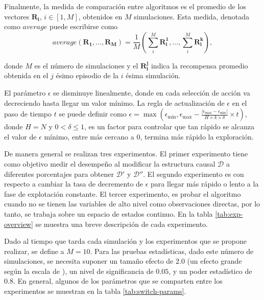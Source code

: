 Finalmente, la medida de comparación entre algoritmos es
el promedio de los vectores $\mathbf{R_i}$, $i\in [1, M]$,  obtenidos en $M$ simulaciones. Esta medida, denotada como  $average$ puede escribirse como 
\begin{equation}
\label{eq:average}
average(\mathbf{R_1}, \dots, \mathbf{R_M}) = \frac{1}{M}(\sum^M_i \mathbf{R_{i}^1}, \dots, \sum^M_i\mathbf{R_{i}^k}),    
\end{equation}

donde $M$ es el número de simulaciones y el $\mathbf{R_i^j}$ indica la recompensa promedio obtenida en el $j$ ésimo episodio de la $i$ ésima simulación.

El parámetro $\epsilon$ se disminuye linealmente, donde
en cada selección de acción va decreciendo hasta llegar
un valor mínimo. La regla de actualización de $\epsilon$ en
el paso de tiempo $t$ se puede definir como $\epsilon = \max(\epsilon_{\min}, \epsilon_{\max} - \frac{|\epsilon_{\max} - \epsilon_{\min}|}{H \times k \times \delta} \times t)$, donde $H=N$ y $0 < \delta \leq 1$, es un factor para controlar
que tan rápido se alcanza el valor de $\epsilon$  mínimo, entre más cercano a 0,
termina más rápido la exploración.

De manera general se realizan tres experimentos. El primer experimento tiene 
como objetivo medir el desempeño al modificar la estructura causal $\mathcal{D}$ a diferentes porcentajes para obtener $\mathcal{D'}$ y $\mathcal{D}''$. El segundo experimento es con respecto a cambiar la tasa de decremento
de $\epsilon$ para llegar más rápido o lento a la fase de 
explotación constante. El tercer experimento, es probar
el algoritmo cuando no se tienen las variables
de alto nivel como observaciones directas, por lo tanto,
se trabaja sobre un espacio de estados continuo. En la tabla \ref{tab:exp-overview} se muestra una breve descripción de cada experimento.

Dado al tiempo que tarda cada simulación y los experimentos que se
propone realizar, se define a $M= 10$. Para las pruebas estadísticas, dado
este número de simulaciones, se necesita suponer un tamaño efecto de $2.0$ 
(un efecto grande según la escala
de \citet{cohen2013statistical}), un nivel de significancia de $0.05$, y
un poder estadístico de  $0.8$.
En general,
algunos de los parámetros que se comparten entre los experimentos se muestran en la tabla \ref{tab:switch-params}. 

